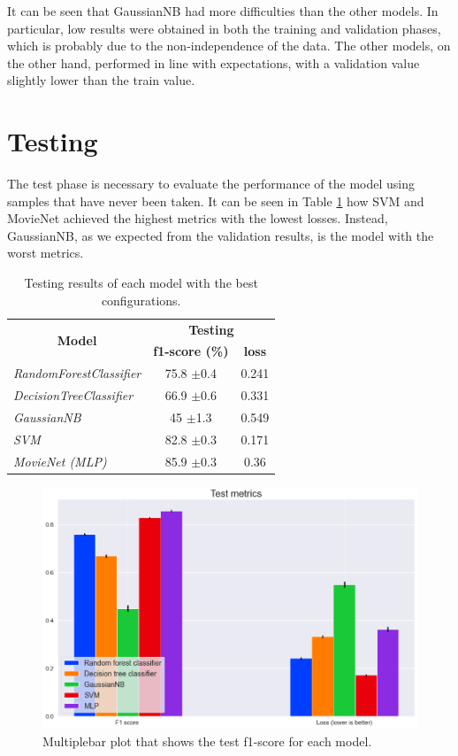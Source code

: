 \documentclass[../main]{subfiles}
\begin{document}
It can be seen that GaussianNB had more difficulties than the other models.
In particular, low results were obtained in both the training and validation phases, which is probably due to the non-independence of the data.
The other models, on the other hand, performed in line with expectations, with a validation value slightly lower than the train value.

\section{Testing}
The test phase is necessary to evaluate the performance of the model using samples that have never been taken.
It can be seen in Table \ref{table:test_results} how SVM and MovieNet achieved the highest metrics with the lowest losses.
Instead, GaussianNB, as we expected from the validation results, is the model with the worst metrics.

\begin{table}[!ht]
    \center
    \begin{tabular}{|l|cc|}
        \hline
        \multicolumn{1}{|c|}{\multirow{2}{*}{\textbf{Model}}} & \multicolumn{2}{c|}{\textbf{Testing}}               \\
        \cline{2-3} 
        \multicolumn{1}{|c|}{}                                & \multicolumn{1}{c|}{\textbf{f1-score (\%)}} & \textbf{loss}  \\ 
        \hline
        \textit{RandomForestClassifier}                       & \multicolumn{1}{c|}{75.8 $\pm$0.4}             & 0.241 \\
        \hline
        \textit{DecisionTreeClassifier}                       & \multicolumn{1}{c|}{66.9 $\pm$0.6}                & 0.331  \\
        \hline
        \textit{GaussianNB}                                   & \multicolumn{1}{c|}{45 $\pm$1.3}                & 0.549 \\
        \hline
        \textit{SVM}                                          & \multicolumn{1}{c|}{82.8 $\pm$0.3}              & 0.171  \\
        \hline
        \textit{MovieNet (MLP)}                                     & \multicolumn{1}{c|}{85.9 $\pm$0.3}              & 0.36  \\ \hline
    \end{tabular}
    \caption{Testing results of each model with the best configurations.}
    \label{table:test_results}
\end{table}

\begin{figure}[!ht]
    \center
    \includegraphics[width=0.8\linewidth]{figures/test_metric_plot.png}
    \caption{Multiplebar plot that shows the test f1-score for each model.}
    \label{fig:test_metric_plot}
\end{figure}
\end{document}
